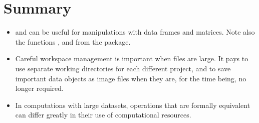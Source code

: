 \section{Summary}
\begin{itemize}
\item[]  and  can be useful for
  manipulations with data frames and matrices.  Note also the
  functions ,  and  from the
   package.

\item[] Careful workspace management is important when files
are large.  It pays to use separate working directories for each
different project, and to save important data objects as image files
when they are, for the time being, no longer required.

\item[] In computations with large datasets, operations that
are formally equivalent can differ greatly in their use of
computational resources.

\end{itemize}
